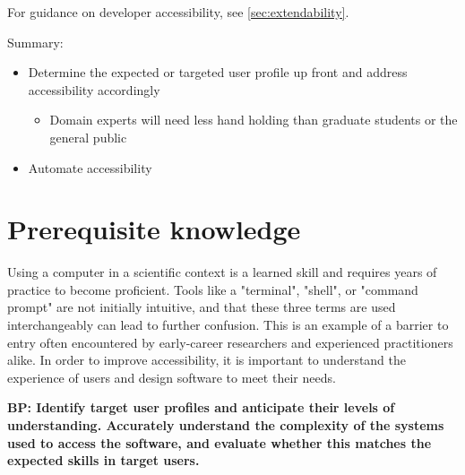 \documentclass[]{nrel}
\begin{document}
For guidance on developer accessibility, see \ref{sec:extendability}.

Summary:
\begin{itemize}
\item Determine the expected or targeted user profile up front and address accessibility accordingly
\begin{itemize}
\item Domain experts will need less hand holding than graduate students or the general public

\end{itemize}

\item Automate accessibility

\end{itemize}


\section{Prerequisite knowledge}
Using a computer in a scientific context is a learned skill and requires years of practice to
become proficient. Tools like a "terminal", "shell", or "command prompt" are not initially
intuitive, and that these three terms are used interchangeably can lead to further confusion.
This is an example of a barrier to entry often encountered by early-career researchers and
experienced practitioners alike. In order to improve accessibility, it is important to
understand the experience of users and design software to meet their needs.

\textbf{BP: Identify target user profiles and anticipate their levels of understanding. Accurately
understand the complexity of the systems used to access the software, and evaluate whether
this matches the expected skills in target users.}
\end{document}
